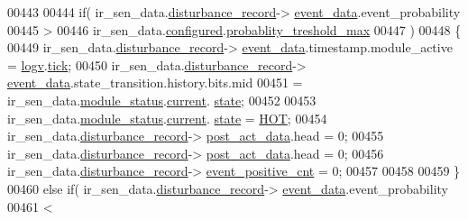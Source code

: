 \begin{DoxyCode}
00443 
00444                    \textcolor{keywordflow}{if}( ir\_sen\_data.\hyperlink{a00023_ac9b38e2c1d3f1013a88d33506c754152}{disturbance\_record}->
      \hyperlink{a00028_a8c0bda69e71ef674e60da47ad0be9ab0}{event\_data}.event\_probability
00445                         >
00446                        ir\_sen\_data.\hyperlink{a00023_a94b2d1f6ea4ab334c74d24984dd27843}{configured}.\hyperlink{a00021_a7e2d217b9c9051d361319180a426851c}{probablity\_treshold\_max}
00447                      )
00448                    \{
00449                        ir\_sen\_data.\hyperlink{a00023_ac9b38e2c1d3f1013a88d33506c754152}{disturbance\_record}->
      \hyperlink{a00028_a8c0bda69e71ef674e60da47ad0be9ab0}{event\_data}.timestamp.module\_active = \hyperlink{a00021_a2e89c46668b39a17753c238950c9e1ec}{logv}.\hyperlink{a00021_a81f0ce68c2c483fb8df726cc1988d8e8}{tick};
00450                          ir\_sen\_data.\hyperlink{a00023_ac9b38e2c1d3f1013a88d33506c754152}{disturbance\_record}->
      \hyperlink{a00028_a8c0bda69e71ef674e60da47ad0be9ab0}{event\_data}.state\_transition.history.bits.mid
00451                          = ir\_sen\_data.\hyperlink{a00023_a5a53c391562b059eb744ac679f3765ca}{module\_status}.\hyperlink{a00017_ab8af48cdbba92b3ae39c4470e53af944}{current}.
      \hyperlink{a00017_a6b8d8e916bc56265a3fd279bd26b6d1b}{state};
00452 
00453                          ir\_sen\_data.\hyperlink{a00023_a5a53c391562b059eb744ac679f3765ca}{module\_status}.\hyperlink{a00017_ab8af48cdbba92b3ae39c4470e53af944}{current}.
      \hyperlink{a00017_a6b8d8e916bc56265a3fd279bd26b6d1b}{state} = \hyperlink{a00021_a1eb14cc432874ddacd1934791dbe12a3}{HOT};
00454                          ir\_sen\_data.\hyperlink{a00023_ac9b38e2c1d3f1013a88d33506c754152}{disturbance\_record}->
      \hyperlink{a00028_a9c699c0cc82d0baa6e49195f185ab34f}{post\_act\_data}.head = 0;
00455                          ir\_sen\_data.\hyperlink{a00023_ac9b38e2c1d3f1013a88d33506c754152}{disturbance\_record}->
      \hyperlink{a00028_a9c699c0cc82d0baa6e49195f185ab34f}{post\_act\_data}.head = 0;
00456                          ir\_sen\_data.\hyperlink{a00023_ac9b38e2c1d3f1013a88d33506c754152}{disturbance\_record}->
      \hyperlink{a00028_a7397b9d76d4b57500f27bb23d258a18a}{event\_positive\_cnt} = 0;
00457 
00458 
00459                    \}
00460                    \textcolor{keywordflow}{else} \textcolor{keywordflow}{if}( ir\_sen\_data.\hyperlink{a00023_ac9b38e2c1d3f1013a88d33506c754152}{disturbance\_record}->
      \hyperlink{a00028_a8c0bda69e71ef674e60da47ad0be9ab0}{event\_data}.event\_probability
00461                             <

\end{DoxyCode}
